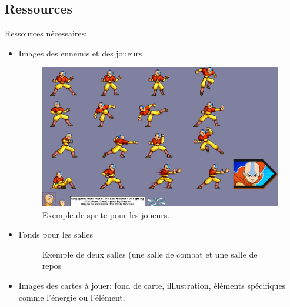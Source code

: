 \subsection{Ressources}

Ressources nécessaires:
\begin{itemize}
    \item Images des ennemis et des joueurs

\begin{figure}[h]
\begin{center}
\includegraphics[scale = 0.3]{images/Aang.png}
\caption{\label{uml:state}Exemple de sprite pour les joueurs.}
\end{center}
\end{figure}

    \item Fonds pour les salles

\begin{figure}[h]
\begin{center}
%
\qquad
{}%
\caption{\label{slaythespiregame}Exemple de deux salles (une salle de combat et une salle de repos}
\end{center}
\end{figure}
    \newpage
    \item Images des cartes à jouer: fond de carte, illlustration, éléments spécifiques comme l'énergie ou l'élément.


\end{itemize}
